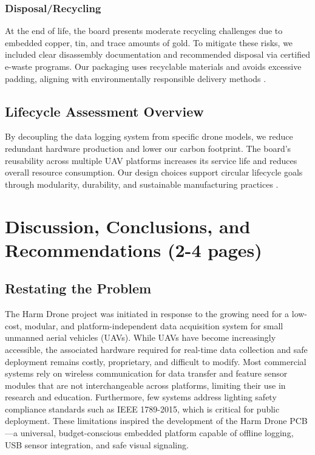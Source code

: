 \documentclass[12pt]{article}
\begin{document}
\subsubsection{Disposal/Recycling}

\par At the end of life, the board presents moderate recycling challenges due to embedded copper, tin, and trace amounts of gold. To mitigate these risks, we included clear disassembly documentation and recommended disposal via certified e-waste programs. Our packaging uses recyclable materials and avoids excessive padding, aligning with environmentally responsible delivery methods \cite{goncalves_uav}.

\subsection{Lifecycle Assessment Overview}

\par By decoupling the data logging system from specific drone models, we reduce redundant hardware production and lower our carbon footprint. The board’s reusability across multiple UAV platforms increases its service life and reduces overall resource consumption. Our design choices support circular lifecycle goals through modularity, durability, and sustainable manufacturing practices \cite{goncalves_uav}.
\section{Discussion, Conclusions, and Recommendations (2-4 pages)}
\subsection{Restating the Problem}

\par The Harm Drone project was initiated in response to the growing need for a low-cost, modular, and platform-independent data acquisition system for small unmanned aerial vehicles (UAVs). While UAVs have become increasingly accessible, the associated hardware required for real-time data collection and safe deployment remains costly, proprietary, and difficult to modify. Most commercial systems rely on wireless communication for data transfer and feature sensor modules that are not interchangeable across platforms, limiting their use in research and education. Furthermore, few systems address lighting safety compliance standards such as IEEE 1789-2015, which is critical for public deployment. These limitations inspired the development of the Harm Drone PCB—a universal, budget-conscious embedded platform capable of offline logging, USB sensor integration, and safe visual signaling.
\end{document}
